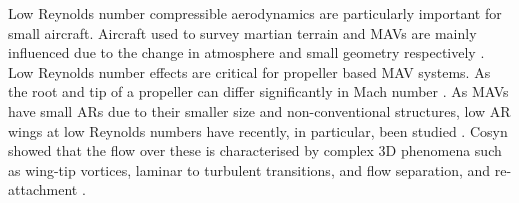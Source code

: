 
Low Reynolds number compressible aerodynamics are particularly important for small aircraft. Aircraft used to survey martian terrain and MAVs are mainly influenced due to the change in atmosphere and small geometry respectively \cite{Munday2015}. Low Reynolds number effects are critical for propeller based MAV systems. As the root and tip of a propeller can differ significantly in Mach number \cite{Munday2015}. As MAVs have small ARs due to their smaller size and non-conventional structures, low AR wings at low Reynolds numbers have recently, in particular, been studied \cite{Bhat2019} \cite{Torres2012}. Cosyn showed that the flow over these is characterised by complex 3D phenomena such as wing-tip vortices, laminar to turbulent transitions, and flow separation, and re-attachment \cite{Cosyn2012}.

